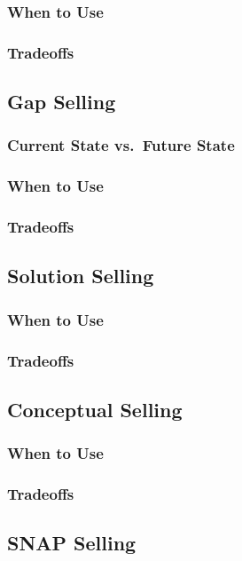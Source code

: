         \subsubsection{When to Use}\mbox{}
        \subsubsection{Tradeoffs}\mbox{}
    \subsection{Gap Selling}\mbox{}
        \subsubsection{Current State vs.\ Future State}\mbox{}
        \subsubsection{When to Use}\mbox{}
        \subsubsection{Tradeoffs}\mbox{}
    \subsection{Solution Selling}\mbox{}
        \subsubsection{When to Use}\mbox{}
        \subsubsection{Tradeoffs}\mbox{}
    \subsection{Conceptual Selling}\mbox{}
        \subsubsection{When to Use}\mbox{}
        \subsubsection{Tradeoffs}\mbox{}
    \subsection{SNAP Selling}\mbox{}
